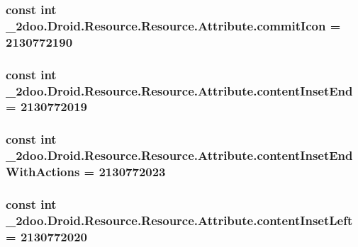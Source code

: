 \hypertarget{class__2doo_1_1_droid_1_1_resource_1_1_attribute_3fde57e408b7ecbf5d3f9a4272beb365}{
\subsubsection[{commitIcon}]{\setlength{\rightskip}{0pt plus 5cm}const int \_\-2doo.Droid.Resource.Resource.Attribute.commitIcon = 2130772190}}
\label{class__2doo_1_1_droid_1_1_resource_1_1_attribute_3fde57e408b7ecbf5d3f9a4272beb365}


\hypertarget{class__2doo_1_1_droid_1_1_resource_1_1_attribute_744fe3c72e1d3144cf1f5754e41ed85d}{
\subsubsection[{contentInsetEnd}]{\setlength{\rightskip}{0pt plus 5cm}const int \_\-2doo.Droid.Resource.Resource.Attribute.contentInsetEnd = 2130772019}}
\label{class__2doo_1_1_droid_1_1_resource_1_1_attribute_744fe3c72e1d3144cf1f5754e41ed85d}


\hypertarget{class__2doo_1_1_droid_1_1_resource_1_1_attribute_a7ff5959b2a532b96b2f92f9da8a28e3}{
\subsubsection[{contentInsetEndWithActions}]{\setlength{\rightskip}{0pt plus 5cm}const int \_\-2doo.Droid.Resource.Resource.Attribute.contentInsetEndWithActions = 2130772023}}
\label{class__2doo_1_1_droid_1_1_resource_1_1_attribute_a7ff5959b2a532b96b2f92f9da8a28e3}


\hypertarget{class__2doo_1_1_droid_1_1_resource_1_1_attribute_7ce3e88c3f9c3a8b25e1415b41dae664}{
\subsubsection[{contentInsetLeft}]{\setlength{\rightskip}{0pt plus 5cm}const int \_\-2doo.Droid.Resource.Resource.Attribute.contentInsetLeft = 2130772020}}
\label{class__2doo_1_1_droid_1_1_resource_1_1_attribute_7ce3e88c3f9c3a8b25e1415b41dae664}


